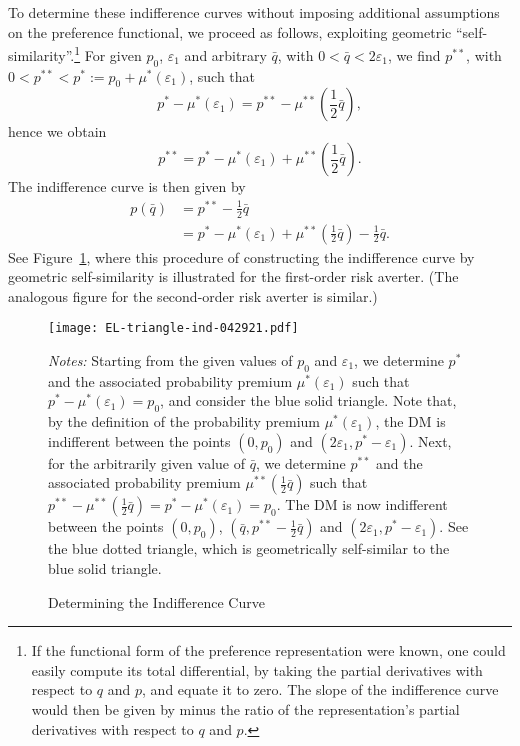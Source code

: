 \documentclass[11pt]{article}
\begin{document}
To determine these indifference curves
without imposing additional assumptions on the preference functional,
we proceed as follows, exploiting geometric ``self-similarity''.\footnote{If the functional form of the preference representation were known,
one could easily compute its total differential, by taking the partial derivatives with respect to $q$ and $p$, and equate it to zero.
The slope of the indifference curve would then be given by minus the ratio of the representation's partial derivatives with respect to $q$ and $p$.}
For given $p_{0}$, $\varepsilon_{1}$ and arbitrary $\bar{q}$, with $0<\bar{q}<2\varepsilon_{1}$,
we find $p^{\ast\ast}$, with $0<p^{\ast\ast}<p^{\ast}:=p_{0}+\mu^{\ast}(\varepsilon_{1})$, such that
\begin{equation*}
p^{\ast}-\mu^{\ast}(\varepsilon_{1})=p^{\ast\ast}-\mu^{\ast\ast}\left(\frac{1}{2}\bar{q}\right),
\end{equation*}
hence we obtain
\begin{equation*}
p^{\ast\ast}=p^{\ast}-\mu^{\ast}(\varepsilon_{1})+\mu^{\ast\ast}\left(\frac{1}{2}\bar{q}\right).
\end{equation*}
The indifference curve is then given by
\begin{align}
p(\bar{q})&=p^{\ast\ast}-\frac{1}{2}\bar{q}\nonumber\\
&=p^{\ast}-\mu^{\ast}(\varepsilon_{1})+\mu^{\ast\ast}\left(\frac{1}{2}\bar{q}\right)-\frac{1}{2}\bar{q}.
\label{eq:indiff}
\end{align}
See Figure~\ref{fig:ind-EL-triangle}, where this procedure of constructing the indifference curve by geometric self-similarity is illustrated for the first-order risk averter.
(The analogous figure for the second-order risk averter is similar.)
\vskip -0.5cm
\begin{figure}[H]
\begin{center}
\caption{Determining the Indifference Curve
}
\vskip 0.37cm
\texttt{[image: EL-triangle-ind-042921.pdf]}
\label{fig:ind-EL-triangle}
\end{center}
{\footnotesize \textit{Notes:} Starting from the given values of $p_{0}$ and $\varepsilon_{1}$, we determine $p^{\ast}$ and the associated probability premium $\mu^{\ast}(\varepsilon_{1})$
such that $p^{\ast}-\mu^{\ast}(\varepsilon_{1})=p_{0}$, and consider the blue solid triangle.
Note that, by the definition of the probability premium $\mu^{\ast}(\varepsilon_{1})$, the DM is indifferent between the points $(0,p_{0})$ and $(2\varepsilon_{1},p^{\ast}-\varepsilon_{1})$.
Next, for the arbitrarily given value of $\bar{q}$, we determine $p^{\ast\ast}$ and the associated probability premium $\mu^{\ast\ast}\left(\frac{1}{2}\bar{q}\right)$
such that $p^{\ast\ast}-\mu^{\ast\ast}\left(\frac{1}{2}\bar{q}\right)=p^{\ast}-\mu^{\ast}(\varepsilon_{1})=p_{0}$.
The DM is now indifferent between the points $(0,p_{0})$, $(\bar{q},p^{\ast\ast}-\tfrac{1}{2}\bar{q})$ and $(2\varepsilon_{1},p^{\ast}-\varepsilon_{1})$.
See the blue dotted triangle, which is geometrically self-similar to the blue solid triangle.}
\end{figure}
\noindent
\end{document}
